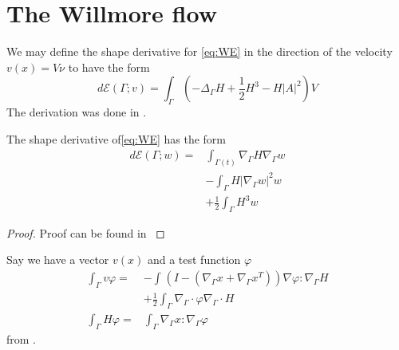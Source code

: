 

\newpage
\section{The Willmore flow}%
\label{sec:evolutionary_pde_s_of_the_willmore_flow}

We may define the shape derivative for \eqref{eq:WE} in the direction of the velocity $v\left( x \right)  = V \nu  $  to have the form \[
d\mathcal{E} \left( \Gamma; v  \right)  = \int_{\Gamma }^{} \left( - \Delta _{\Gamma } H + \frac{1}{2} H^{3} - H \left\lvert A \right\rvert^2  \right) V
\]
The derivation was done in \cite[Corally 4.7]{dougan2012first}.

\begin{lemma}
The shape derivative of\eqref{eq:WE} has the form
\[
    \begin{split}
        d\mathcal{E} \left( \Gamma; w  \right)  =& \int_{\Gamma \left( t \right) }^{}  \nabla_{\Gamma } H  \nabla _{\Gamma } w    \\
    & - \int_{\Gamma }^{} H  |\nabla _{\Gamma }  w |^{2} w   \\
    &  + \frac{1}{2} \int_{\Gamma }^{} H^{3} w
    \end{split}
\]

\end{lemma}

\begin{proof}
    Proof can be found in \cite{willmore1996riemannian}
\end{proof}



Say we have a vector $v\left( x \right) $ and a test function $\varphi $ \[
\begin{split}
    \int_{\Gamma }^{}  v \varphi   = &  -  \int_{}^{}   \left( I - \left( \nabla _{\Gamma } x + \nabla _{\Gamma } x ^{T} \right) \right)  \nabla \varphi : \nabla _{\Gamma } H  \\
     &  + \frac{1}{2} \int_{\Gamma }^{}  \nabla _{\Gamma }\cdot \varphi \nabla
     _{\Gamma } \cdot H \\
     \int_{\Gamma }^{} H \varphi  =&  \int_{\Gamma }^{} \nabla _{\Gamma } x : \nabla _{\Gamma } \varphi
\end{split}
\]
from \cite{bonito2010parametric, dougan2012first}.







